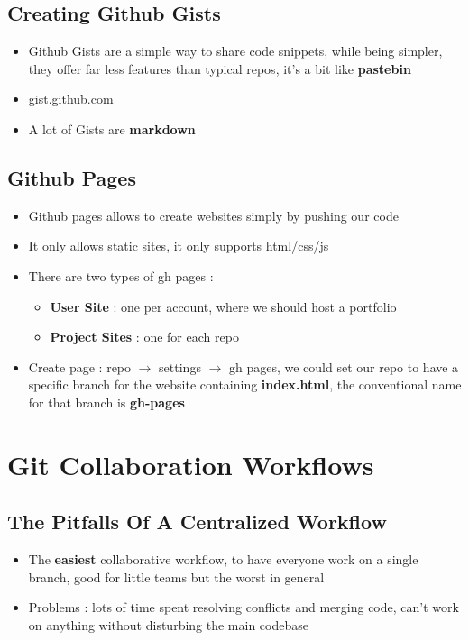 \documentclass{report}
\begin{document}
\section{Creating Github Gists}

\begin{itemize}
	\item Github Gists are a simple way to share code snippets, while being simpler, they offer far less features than typical repos, it's a bit like \textbf{pastebin} 
	\item gist.github.com 
	\item A lot of Gists are \textbf{markdown}
\end{itemize}


\section{Github Pages}

\begin{itemize}
	\item Github pages allows to create websites simply by pushing our code 
	\item It only allows static sites, it only supports html/css/js 
	\item There are two types of gh pages :
		\begin{itemize}
			\item \textbf{User Site} : one per account, where we should host a portfolio
			\item \textbf{Project Sites} : one for each repo
		\end{itemize}
	\item Create page : repo $\rightarrow$ settings $\rightarrow$ gh pages, we could set our repo to have a specific branch for the website containing \textbf{index.html}, the conventional name for that branch is \textbf{gh-pages}  
\end{itemize}


\chapter{Git Collaboration Workflows}

\section{The Pitfalls Of A Centralized Workflow}

\begin{itemize}
	\item The \textbf{easiest} collaborative workflow, to have everyone work on a single branch, good for little teams but the worst in general 
	\item Problems : lots of time spent resolving conflicts and merging code, can't work on anything without disturbing the main codebase
\end{itemize}
\end{document}
